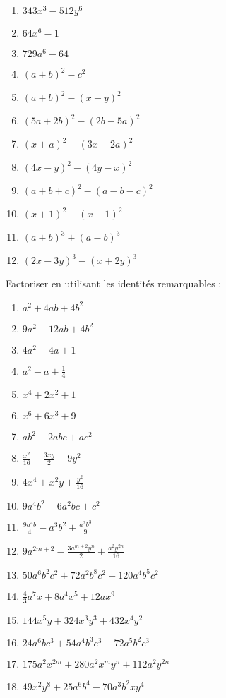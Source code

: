 \begin{exercice}
\begin{multicols}{2}
\begin{enumerate}
\item $343{{x}^{3}}-512{{y}^{6}}$
\item $64{{x}^{6}}-1$
\item $729{{a}^{6}}-64$
\item ${{(a+b)}^{2}}-{{c}^{2}}$
\item ${{(a+b)}^{2}}-{{(x-y)}^{2}}$
\item ${{(5a+2b)}^{2}}-{{(2b-5a)}^{2}}$
\item ${{(x+a)}^{2}}-{{(3x-2a)}^{2}}$
\item ${{(4x-y)}^{2}}-{{(4y-x)}^{2}}$
\item ${{(a+b+c)}^{2}}-{{(a-b-c)}^{2}}$
\item ${{(x+1)}^{2}}-{{(x-1)}^{2}}$
\item ${{(a+b)}^{3}}+{{(a-b)}^{3}}$
\item ${{(2x-3y)}^{3}}-{{(x+2y)}^{3}}$
\end{enumerate}
\end{multicols}
\end{exercice}

\begin{exercice}
Factoriser en utilisant les identités remarquables :
\begin{multicols}{2}
\begin{enumerate}
\item ${{a}^{2}}+4ab+4{{b}^{2}}$
\item $9{{a}^{2}}-12ab+4{{b}^{2}}$
\item $4{{a}^{2}}-4a+1$
\item ${{a}^{2}}-a+\frac{1}{4}$
\item ${{x}^{4}}+2{{x}^{2}}+1$
\item ${{x}^{6}}+6{{x}^{3}}+9$
\item $a{{b}^{2}}-2abc+a{{c}^{2}}$
\item $\frac{{{x}^{2}}}{16}-\frac{3xy}{2}+9{{y}^{2}}$
\item $4{{x}^{4}}+{{x}^{2}}y+\frac{{{y}^{2}}}{16}$
\item $9{{a}^{4}}{{b}^{2}}-6{{a}^{2}}bc+{{c}^{2}}$
\item $\frac{9{{a}^{4}}b}{4}-{{a}^{3}}{{b}^{2}}+\frac{{{a}^{2}}{{b}^{3}}}{9}$
\item $9{{a}^{2m+2}}-\frac{3{{a}^{m+2}}{{y}^{n}}}{2}+\frac{{{a}^{2}}{{y}^{2n}}}{16}$
\item $50{{a}^{6}}{{b}^{2}}{{c}^{2}}+72{{a}^{2}}{{b}^{8}}{{c}^{2}}+120{{a}^{4}}{{b}^{5}}{{c}^{2}}$
\item $\frac{4}{3}{{a}^{7}}x+8{{a}^{4}}{{x}^{5}}+12a{{x}^{9}}$
\item $144{{x}^{5}}y+324{{x}^{3}}{{y}^{3}}+432{{x}^{4}}{{y}^{2}}$
\item $24{{a}^{6}}b{{c}^{3}}+54{{a}^{4}}{{b}^{3}}{{c}^{3}}-72{{a}^{5}}{{b}^{2}}{{c}^{3}}$
\item $175{{a}^{2}}{{x}^{2m}}+280{{a}^{2}}{{x}^{m}}{{y}^{n}}+112{{a}^{2}}{{y}^{2n}}$
\item $49{{x}^{2}}{{y}^{8}}+25{{a}^{6}}{{b}^{4}}-70{{a}^{3}}{{b}^{2}}x{{y}^{4}}$
\end{enumerate}
\end{multicols}
\end{exercice}

